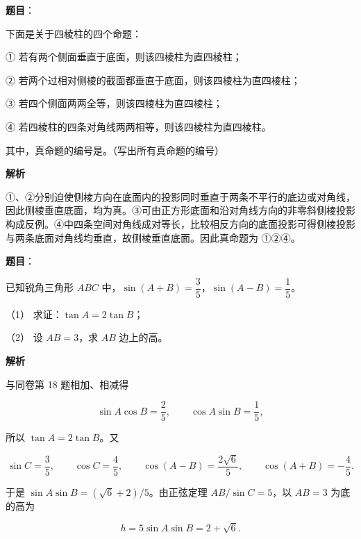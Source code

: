 \begin{answer}

\textbf{题目}：

下面是关于四棱柱的四个命题：

① 若有两个侧面垂直于底面，则该四棱柱为直四棱柱；

② 若两个过相对侧棱的截面都垂直于底面，则该四棱柱为直四棱柱；

③ 若四个侧面两两全等，则该四棱柱为直四棱柱；

④ 若四棱柱的四条对角线两两相等，则该四棱柱为直四棱柱。

其中，真命题的编号是\gkblank{}。（写出所有真命题的编号）

\textbf{解析}

①、②分别迫使侧棱方向在底面内的投影同时垂直于两条不平行的底边或对角线，因此侧棱垂直底面，均为真。③可由正方形底面和沿对角线方向的非零斜侧棱投影构成反例。④中四条空间对角线成对等长，比较相反方向的底面投影可得侧棱投影与两条底面对角线均垂直，故侧棱垂直底面。因此真命题为 ①②④。


\end{answer}
\begin{answer}

\textbf{题目}：

已知锐角三角形 $ABC$ 中，$\sin(A+B)=\dfrac35$，$\sin(A-B)=\dfrac15$。

（1） 求证：$\tan A=2\tan B$；

（2） 设 $AB=3$，求 $AB$ 边上的高。

\textbf{解析}


与同卷第 18 题相加、相减得

\nopagebreak[4]
\[
\sin A\cos B=\frac25,\qquad \cos A\sin B=\frac15,
\]

所以 $\tan A=2\tan B$。又

\nopagebreak[4]
\[
\sin C=\frac35,\qquad \cos C=\frac45,\qquad
\cos(A-B)=\frac{2\sqrt6}{5},\qquad \cos(A+B)=-\frac45.
\]


于是 $\sin A\sin B=(\sqrt6+2)/5$。由正弦定理 $AB/\sin C=5$，以 $AB=3$ 为底的高为

\nopagebreak[4]
\[
h=5\sin A\sin B=2+\sqrt6.
\]



\end{answer}
